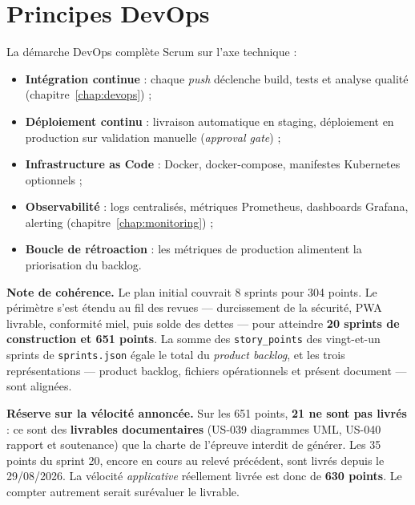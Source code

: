 \section{Principes DevOps}

La démarche DevOps complète Scrum sur l'axe technique :

\begin{itemize}
  \item \textbf{Intégration continue} : chaque \emph{push} déclenche build,
        tests et analyse qualité (chapitre~\ref{chap:devops}) ;
  \item \textbf{Déploiement continu} : livraison automatique en staging,
        déploiement en production sur validation manuelle (\emph{approval gate}) ;
  \item \textbf{Infrastructure as Code} : Docker, docker-compose,
        manifestes Kubernetes optionnels ;
  \item \textbf{Observabilité} : logs centralisés, métriques Prometheus,
        dashboards Grafana, alerting (chapitre~\ref{chap:monitoring}) ;
  \item \textbf{Boucle de rétroaction} : les métriques de production
        alimentent la priorisation du backlog.
\end{itemize}

\begin{encadre}
\textbf{Note de cohérence.} Le plan initial couvrait 8 sprints pour
304 points. Le périmètre s'est étendu au fil des revues --- durcissement de
la sécurité, PWA livrable, conformité miel, puis solde des dettes --- pour
atteindre \textbf{20 sprints de construction et 651 points}. La somme des
\texttt{story\_points} des vingt-et-un sprints de \texttt{sprints.json} égale
le total du \emph{product backlog}, et les trois représentations --- product
backlog, fichiers opérationnels et présent document --- sont alignées.

\smallskip
\textbf{Réserve sur la vélocité annoncée.} Sur les 651 points, \textbf{21 ne
sont pas livrés} : ce sont des \textbf{livrables documentaires} (US-039
diagrammes UML, US-040 rapport et soutenance) que la charte de l'épreuve interdit
de générer. Les 35 points du sprint 20, encore en cours au relevé précédent, sont
livrés depuis le 29/08/2026. La vélocité \emph{applicative} réellement livrée est
donc de \textbf{630 points}. Le compter autrement serait surévaluer le livrable.
\end{encadre}
